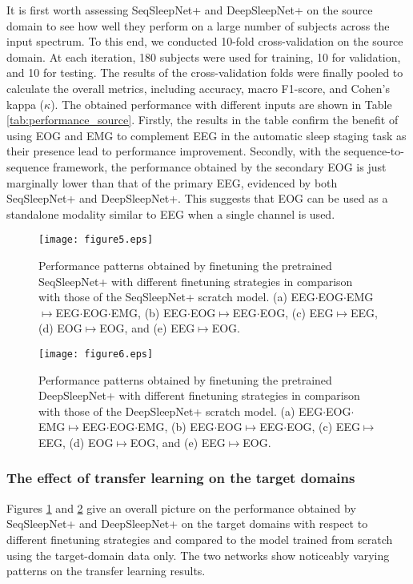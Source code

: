 \documentclass[journal,twoside,web]{ieeecolor}
\begin{document}
It is first worth assessing SeqSleepNet+ and DeepSleepNet+ on the source domain to see how well they perform on a large number of subjects across the input spectrum. 
To this end, we conducted 10-fold cross-validation on the source domain. At each iteration, 180 subjects were used for training, 10 for validation, and 10 for testing. The results of the cross-validation folds were finally pooled to calculate the overall metrics, including accuracy, macro F1-score, and Cohen's kappa ($\kappa$). The obtained performance with different inputs are shown in Table \ref{tab:performance_source}. Firstly, the results in the table confirm the benefit of using EOG and EMG to complement EEG in the automatic sleep staging task as their presence lead to performance improvement. Secondly, with the sequence-to-sequence framework, the performance obtained by the secondary EOG is just marginally lower than that of the primary EEG, evidenced by both SeqSleepNet+ and DeepSleepNet+. This suggests that EOG can be used as a standalone modality similar to EEG when a single channel is used. 

\begin{figure} [!t]
	\centering
	\texttt{[image: figure5.eps]}
\caption{Performance patterns obtained by finetuning the pretrained SeqSleepNet+ with different finetuning strategies in comparison with those of the SeqSleepNet+ scratch model. (a) EEG$\cdot$EOG$\cdot$EMG$\mapsto$EEG$\cdot$EOG$\cdot$EMG, (b) EEG$\cdot$EOG$\mapsto$EEG$\cdot$EOG, (c) EEG$\mapsto$EEG, (d) EOG$\mapsto$EOG, and (e) EEG$\mapsto$EOG.}
	\label{fig:seqsleepnet_finetune}
	\vspace{-0.35cm}
\end{figure}

\begin{figure} [!t]
	\centering
	\texttt{[image: figure6.eps]}
\caption{Performance patterns obtained by finetuning the pretrained DeepSleepNet+ with different finetuning strategies in comparison with those of the DeepSleepNet+ scratch model. (a) EEG$\cdot$EOG$\cdot$EMG$\mapsto$EEG$\cdot$EOG$\cdot$EMG, (b) EEG$\cdot$EOG$\mapsto$EEG$\cdot$EOG, (c) EEG$\mapsto$EEG, (d) EOG$\mapsto$EOG, and (e) EEG$\mapsto$EOG.}
	\label{fig:deepsleepnet_finetune}
	\vspace{-0.35cm}
\end{figure}

\subsubsection{The effect of transfer learning on the target domains}
\label{sssec:transfer_learning_effects}
Figures \ref{fig:seqsleepnet_finetune} and \ref{fig:deepsleepnet_finetune} give an overall picture on the performance obtained by SeqSleepNet+ and DeepSleepNet+ on the target domains with respect to different finetuning strategies and compared to the model trained from scratch using the target-domain data only.
The two networks show noticeably varying patterns on the transfer learning results. 
\end{document}
